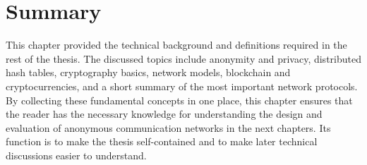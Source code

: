 \section{Summary}
This chapter provided the technical background and definitions required in the rest of the thesis. The discussed topics include anonymity and privacy, distributed hash tables, cryptography basics, network models, blockchain and cryptocurrencies, and a short summary of the most important network protocols. By collecting these fundamental concepts in one place, this chapter ensures that the reader has the necessary knowledge for understanding the design and evaluation of anonymous communication networks in the next chapters. Its function is to make the thesis self-contained and to make later technical discussions easier to understand.
